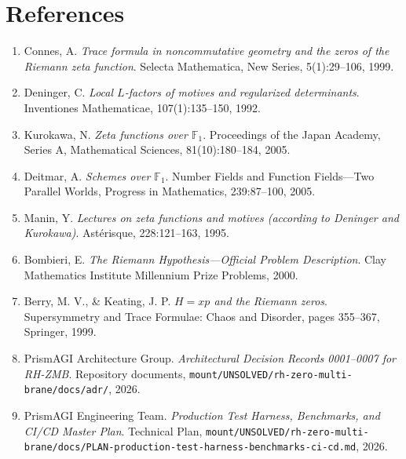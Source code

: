 \documentclass[11pt,a4paper]{article}
\theoremstyle{definition}
\theoremstyle{remark}
\begin{document}
\section*{References}
\begin{enumerate}
    \item Connes, A. \textit{Trace formula in noncommutative geometry and the zeros of the Riemann zeta function}. Selecta Mathematica, New Series, 5(1):29--106, 1999.
    \item Deninger, C. \textit{Local $L$-factors of motives and regularized determinants}. Inventiones Mathematicae, 107(1):135--150, 1992.
    \item Kurokawa, N. \textit{Zeta functions over $\mathbb{F}_1$}. Proceedings of the Japan Academy, Series A, Mathematical Sciences, 81(10):180--184, 2005.
    \item Deitmar, A. \textit{Schemes over $\mathbb{F}_1$}. Number Fields and Function Fields---Two Parallel Worlds, Progress in Mathematics, 239:87--100, 2005.
    \item Manin, Y. \textit{Lectures on zeta functions and motives (according to Deninger and Kurokawa)}. Ast\'erisque, 228:121--163, 1995.
    \item Bombieri, E. \textit{The Riemann Hypothesis---Official Problem Description}. Clay Mathematics Institute Millennium Prize Problems, 2000.
    \item Berry, M. V., \& Keating, J. P. \textit{$H = xp$ and the Riemann zeros}. Supersymmetry and Trace Formulae: Chaos and Disorder, pages 355--367, Springer, 1999.
    \item PrismAGI Architecture Group. \textit{Architectural Decision Records 0001--0007 for RH-ZMB}. Repository documents, \texttt{mount/UNSOLVED/rh-zero-multi-brane/docs/adr/}, 2026.
    \item PrismAGI Engineering Team. \textit{Production Test Harness, Benchmarks, and CI/CD Master Plan}. Technical Plan, \texttt{mount/UNSOLVED/rh-zero-multi-brane/docs/PLAN-production-test-harness-benchmarks-ci-cd.md}, 2026.
\end{enumerate}
\end{document}
